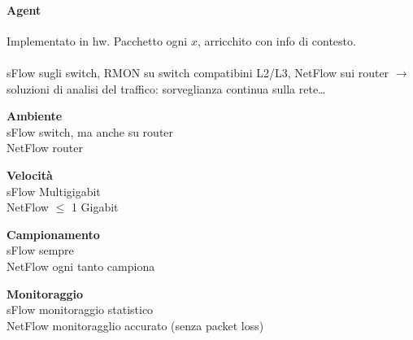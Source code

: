 \documentclass[10pt]{book}
\begin{document}
\paragraph{Agent} Implementato in hw. Pacchetto ogni $x$, arricchito con info di contesto.\\\\
sFlow sugli switch, RMON su switch compatibini L2/L3, NetFlow sui router $\rightarrow$ soluzioni di analisi del traffico: sorveglianza continua sulla rete\ldots
\begin{list}{}{}
	\item \textbf{Ambiente}\\sFlow switch, ma anche su router\\
	NetFlow router
	\item \textbf{Velocità}\\sFlow Multigigabit\\
	NetFlow $\leq$ 1 Gigabit
	\item \textbf{Campionamento}\\sFlow sempre\\
	NetFlow ogni tanto campiona
	\item \textbf{Monitoraggio}\\sFlow monitoraggio statistico\\
	NetFlow monitoragglio accurato (senza packet loss)
\end{list}
\end{document}
